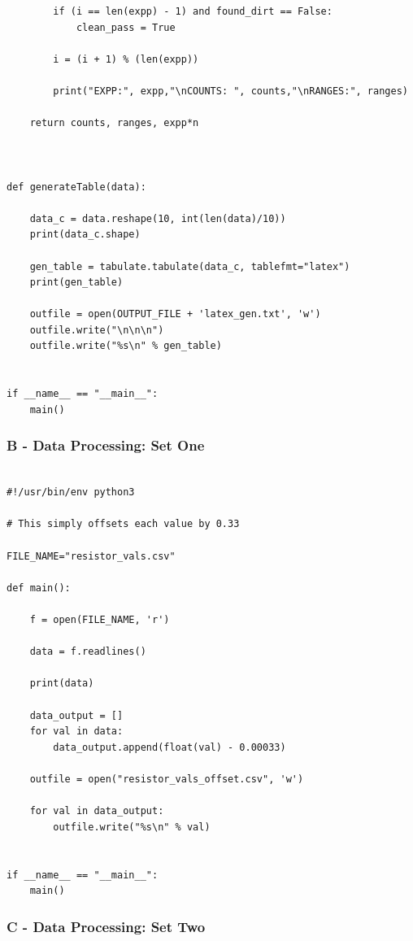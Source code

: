 \documentclass[10pt]{report}
\begin{document}
\begin{lstlisting}
		if (i == len(expp) - 1) and found_dirt == False:
			clean_pass = True

		i = (i + 1) % (len(expp))

		print("EXPP:", expp,"\nCOUNTS: ", counts,"\nRANGES:", ranges)

	return counts, ranges, expp*n



def generateTable(data):

	data_c = data.reshape(10, int(len(data)/10))
	print(data_c.shape)

	gen_table = tabulate.tabulate(data_c, tablefmt="latex")
	print(gen_table)

	outfile = open(OUTPUT_FILE + 'latex_gen.txt', 'w')
	outfile.write("\n\n\n")
	outfile.write("%s\n" % gen_table)   


if __name__ == "__main__":
	main()
\end{lstlisting}



\subsubsection*{B - Data Processing: Set One}

\begin{lstlisting}

#!/usr/bin/env python3

# This simply offsets each value by 0.33

FILE_NAME="resistor_vals.csv"

def main():

	f = open(FILE_NAME, 'r')

	data = f.readlines()

	print(data)

	data_output = []
	for val in data:
		data_output.append(float(val) - 0.00033)

	outfile = open("resistor_vals_offset.csv", 'w')

	for val in data_output:
		outfile.write("%s\n" % val)


if __name__ == "__main__":
	main()

\end{lstlisting}

\subsubsection*{C - Data Processing: Set Two}
\end{document}
